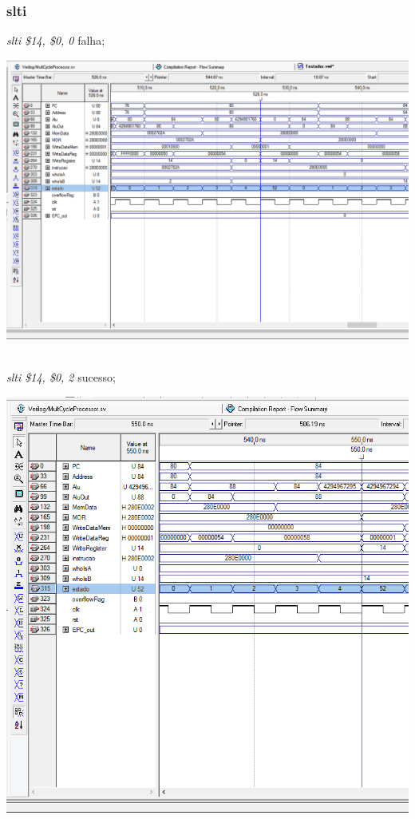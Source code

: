 \documentclass{article}
\begin{document}
    \subsubsection{slti}
    {\it slti \$14, \$0, 0} falha;\\
    \begin{center}
        \includegraphics[scale=0.25]{sltifalha.PNG}
    \end{center}
    \\
    \newpage
    {\it slti \$14, \$0, 2} sucesso;\\
    \begin{center}
        \includegraphics[scale=0.25]{sltisucesso.PNG}
    \end{center}
    
\end{document}
